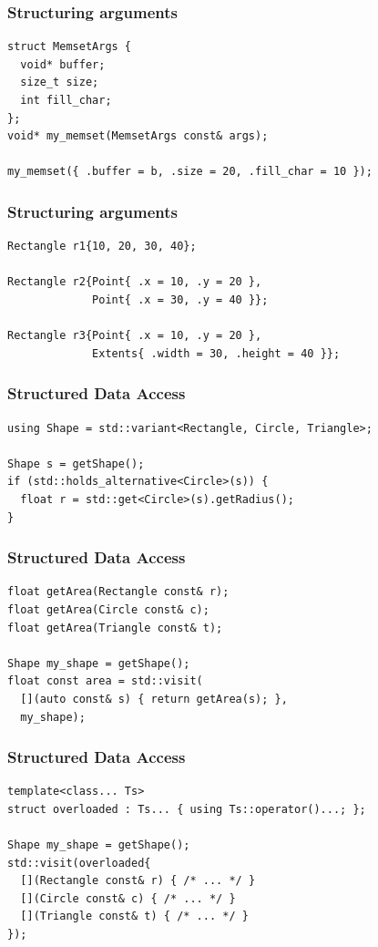 \documentclass[aspectratio=169]{beamer}
\begin{document}
\begin{frame}[fragile]
  \frametitle{Structuring arguments}

  \begin{lstlisting}[style=cpp20]
struct MemsetArgs {
  void* buffer;
  size_t size;
  int fill_char;
};
void* my_memset(MemsetArgs const& args);
  
my_memset({ .buffer = b, .size = 20, .fill_char = 10 });
  \end{lstlisting}
\end{frame}

\begin{frame}[fragile]
  \frametitle{Structuring arguments}
  
  \begin{lstlisting}[style=cpp20]
Rectangle r1{10, 20, 30, 40};

Rectangle r2{Point{ .x = 10, .y = 20 },
             Point{ .x = 30, .y = 40 }};

Rectangle r3{Point{ .x = 10, .y = 20 },
             Extents{ .width = 30, .height = 40 }};
  \end{lstlisting}
\end{frame}


\begin{frame}[fragile]
  \frametitle{Structured Data Access}
  
  \begin{lstlisting}[style=cpp20]
using Shape = std::variant<Rectangle, Circle, Triangle>;

Shape s = getShape();
if (std::holds_alternative<Circle>(s)) {
  float r = std::get<Circle>(s).getRadius();
}
  \end{lstlisting}
\end{frame}

\begin{frame}[fragile]
  \frametitle{Structured Data Access}
  
  \begin{lstlisting}[style=cpp20]
float getArea(Rectangle const& r);
float getArea(Circle const& c);
float getArea(Triangle const& t);

Shape my_shape = getShape();
float const area = std::visit(
  [](auto const& s) { return getArea(s); },
  my_shape);
  \end{lstlisting}
\end{frame}

\begin{frame}[fragile]
  \frametitle{Structured Data Access}
  
  \begin{lstlisting}[style=cpp20]
template<class... Ts>
struct overloaded : Ts... { using Ts::operator()...; };

Shape my_shape = getShape();
std::visit(overloaded{
  [](Rectangle const& r) { /* ... */ }
  [](Circle const& c) { /* ... */ }
  [](Triangle const& t) { /* ... */ }
});
  \end{lstlisting}
\end{frame}
\end{document}
